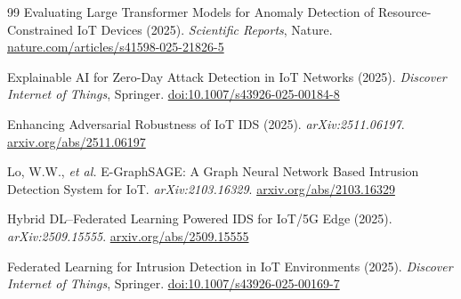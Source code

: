 \documentclass[11pt,a4paper]{article}
\begin{document}
\begin{thebibliography}{99}
 Evaluating Large Transformer Models for Anomaly Detection of Resource-Constrained IoT Devices (2025). \emph{Scientific Reports}, Nature. \href{https://www.nature.com/articles/s41598-025-21826-5}{nature.com/articles/s41598-025-21826-5}

 Explainable AI for Zero-Day Attack Detection in IoT Networks (2025). \emph{Discover Internet of Things}, Springer. \href{https://link.springer.com/article/10.1007/s43926-025-00184-8}{doi:10.1007/s43926-025-00184-8}

 Enhancing Adversarial Robustness of IoT IDS (2025). \emph{arXiv:2511.06197}. \href{https://www.arxiv.org/pdf/2511.06197}{arxiv.org/abs/2511.06197}

 Lo, W.W., \emph{et al.} E-GraphSAGE: A Graph Neural Network Based Intrusion Detection System for IoT. \emph{arXiv:2103.16329}. \href{https://arxiv.org/pdf/2103.16329}{arxiv.org/abs/2103.16329}

 Hybrid DL--Federated Learning Powered IDS for IoT/5G Edge (2025). \emph{arXiv:2509.15555}. \href{https://arxiv.org/html/2509.15555v1}{arxiv.org/abs/2509.15555}

 Federated Learning for Intrusion Detection in IoT Environments (2025). \emph{Discover Internet of Things}, Springer. \href{https://link.springer.com/article/10.1007/s43926-025-00169-7}{doi:10.1007/s43926-025-00169-7}

\end{thebibliography}
\end{document}
